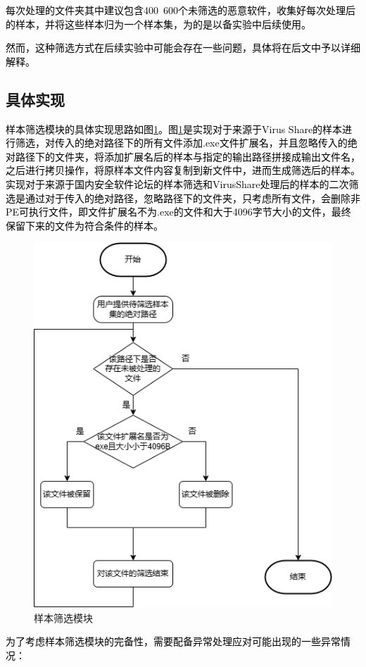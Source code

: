 \textcolor{black}{每次处理的文件夹其中建议包含400~600个未筛选的恶意软件，收集好每次处理后的样本，并将这些样本归为一个样本集，为的是以备实验中后续使用。}

\textcolor{black}{然而，这种筛选方式在后续实验中可能会存在一些问题，具体将在后文中予以详细解释。}

\subsection{具体实现}

\textcolor{black}{样本筛选模块的具体实现思路如图\ref{fig:sample_swift_module}。图\ref{fig:sample_swift_module}是实现对于来源于Virus Share的样本进行筛选，对传入的绝对路径下的所有文件添加.exe文件扩展名，并且忽略传入的绝对路径下的文件夹，将添加扩展名后的样本与指定的输出路径拼接成输出文件名，之后进行拷贝操作，将原样本文件内容复制到新文件中，进而生成筛选后的样本。实现对于来源于国内安全软件论坛的样本筛选和VirusShare处理后的样本的二次筛选是通过对于传入的绝对路径，忽略路径下的文件夹，只考虑所有文件，会删除非PE可执行文件，即文件扩展名不为.exe的文件和大于4096字节大小的文件，最终保留下来的文件为符合条件的样本。}

\begin{figure}[htbp]
  \centering
  \includegraphics[]{images/sample_swift_module.png}
  \caption{样本筛选模块}\label{fig:sample_swift_module}
\end{figure}
\textcolor{black}{为了考虑样本筛选模块的完备性，需要配备异常处理应对可能出现的一些异常情况：}

